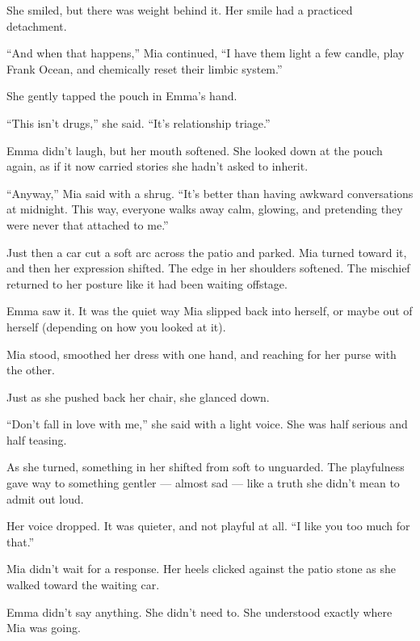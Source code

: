 She smiled, but there was weight behind it. Her smile had a practiced detachment.

``And when that happens,'' Mia continued, ``I have them light a few candle, 
play Frank Ocean, and chemically reset their limbic system.''

She gently tapped the pouch in Emma’s hand.

``This isn’t drugs,'' she said. ``It’s relationship triage.''

Emma didn’t laugh, but her mouth softened. She looked down at the pouch again,
as if it now carried stories she hadn’t asked to inherit.

``Anyway,'' Mia said with a shrug. ``It's better than having awkward conversations 
at midnight. This way, everyone walks away calm, glowing, and pretending they were
never that attached to me.''

Just then a car cut a soft arc across the patio and parked. Mia turned toward it, and
then her expression shifted.
The edge in her shoulders softened. The mischief returned to her posture like it had 
been waiting offstage.

Emma saw it. It was the quiet way Mia slipped back into herself, or maybe out of herself
(depending on how you looked at it).

Mia stood, smoothed her dress with one hand, and reaching for her purse with the other.

Just as she pushed back her chair, she glanced down.

``Don’t fall in love with me,'' she said with a light voice. 
She was half serious and half teasing.

As she turned, something in her shifted from soft to unguarded. 
The playfulness gave way to something gentler --- almost sad --- like a truth she didn’t 
mean to admit out loud.

Her voice dropped. It was quieter, and not playful at all.
``I like you too much for that.''

Mia didn’t wait for a response. Her heels clicked against the patio stone as she walked 
toward the waiting car.

Emma didn’t say anything. She didn’t need to.
She understood exactly where Mia was going.



